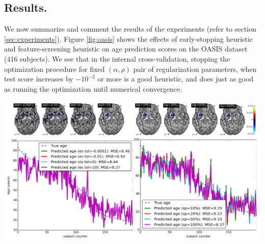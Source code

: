 \subsection{Results.}
We now summarize and comment the results of the experiments (refer to
section \ref{sec:experiments}).
Figure \ref{fig:oasis} shows the effects of early-stopping heuristic
and feature-screening heuristic on age prediction scores on the OASIS
dataset  \citep{marcus2007open} (416 subjects). We see that in the
internal cross-validation, stopping  the optimization procedure for
fixed $(\alpha, \rho)$ pair of regularization parameters, when test
score increases by $-10^{-2}$ or more is a good heuristic, and does just
as good as running the optimization until numerical convergence. 
 \begin{pagefigure}
   \includegraphics[width=1\linewidth]{figures/screening_weights.png}
  \caption{Predicting age from gray-matter concentration maps from the
    OASIS dataset  \citep{marcus2007open}. \textbf{Top}:
    Weights maps (solutions to problem \eqref{eq:opt_pb}).
\textbf{Bottom-left}: Mean Square Error (MSE) in age prediction, for
different subjects of the validation set, for  varying levels of the
early-stopping tolerance (``es tol'' for short), with the
screening-percentile (sp) held constant at 100
(full-brain). \textbf{Bottom-right}: MSE in age prediction, for
varying levels of the screening-percentile (sp).%
}   
\label{fig:oasis}
\end{pagefigure}
